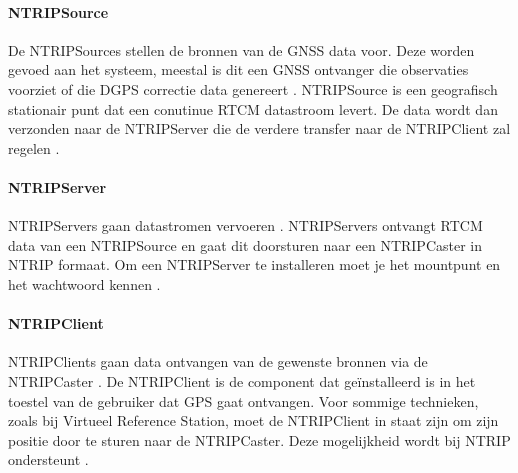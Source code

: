 \paragraph{NTRIPSource}
De NTRIPSources stellen de bronnen van de GNSS data voor. Deze worden gevoed aan het systeem, meestal is dit een GNSS ontvanger die observaties voorziet of die DGPS correctie data genereert \cite{LBibNTRIP3}. NTRIPSource is een geografisch stationair punt dat een conutinue RTCM datastroom levert. De data wordt dan verzonden naar de NTRIPServer die de verdere transfer naar de NTRIPClient zal regelen \cite{LBibNTRIP4}.

\paragraph{NTRIPServer}
NTRIPServers gaan datastromen vervoeren \cite{LBibGPS}. NTRIPServers ontvangt RTCM data van een NTRIPSource en gaat dit doorsturen naar een NTRIPCaster in NTRIP formaat. Om een NTRIPServer te installeren moet je het mountpunt en het wachtwoord kennen \cite{LBibNTRIP4}.
 
\paragraph{NTRIPClient}
NTRIPClients gaan data ontvangen van de gewenste bronnen via de NTRIPCaster \cite{LBibNTRIP}. De NTRIPClient is de component dat ge\"installeerd is in het toestel van de gebruiker dat GPS gaat ontvangen. Voor sommige technieken, zoals bij Virtueel Reference Station, moet de NTRIPClient in staat zijn om zijn positie door te sturen naar de NTRIPCaster. Deze mogelijkheid wordt bij NTRIP ondersteunt \cite{LBibNTRIP4}.



